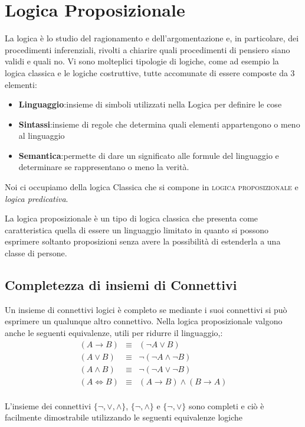 \chapter{Logica Proposizionale}
La logica è lo studio del ragionamento e dell’argomentazione e, in particolare,
dei	procedimenti inferenziali, rivolti a chiarire quali	procedimenti di pensiero siano validi e quali no.
Vi sono molteplici tipologie di logiche, come ad esempio la logica classica e le logiche costruttive,
tutte accomunate di essere composte da 3 elementi:

\begin{itemize}
  \item \textbf{Linguaggio}:insieme di simboli utilizzati nella Logica per definire le cose
  \item \textbf{Sintassi}:insieme di regole che determina quali elementi appartengono o meno al linguaggio
  \item \textbf{Semantica}:permette di dare un significato alle formule del linguaggio e determinare
        se rappresentano o meno la verità.
\end{itemize}

Noi ci occupiamo della logica Classica che si compone in \textsc{logica proposizionale} e
\textit{logica predicativa}.

La logica proposizionale è un tipo di logica classica che presenta come caratteristica quella
di essere un linguaggio limitato in quanto si possono esprimere soltanto proposizioni senza
avere la possibilità di estenderla a una classe di persone.









\section{Completezza di insiemi di Connettivi}
Un insieme di connettivi logici è completo se mediante i suoi connettivi si può
esprimere un qualunque altro connettivo.
Nella logica proposizionale valgono anche le seguenti equivalenze, utili per ridurre il linguaggio,:
\begin{align*}
    (A \rightarrow B) & \equiv & (\neg A \lor B) \\
    (A \lor B) & \equiv & \neg(\neg A \land \neg B) \\
    (A \land B) & \equiv & \neg(\neg A \lor \neg B) \\
    (A \iff B) & \equiv & (A \rightarrow B) \land (B \rightarrow A) \\
\end{align*}

L'insieme dei connettivi $\{ \neg,\lor,\land \}$, $\{ \neg,\land \}$ e $\{ \neg,\lor \}$ sono completi
e ciò è facilmente dimostrabile utilizzando le seguenti equivalenze logiche
